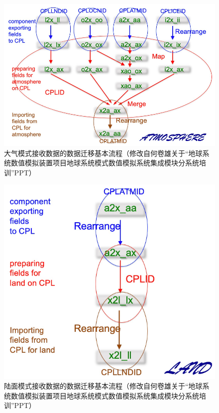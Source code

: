 {
\begin{figure}[htbp]
\centering
\includegraphics{Figures/模式构架/大气接收数据.png}
\caption{大气模式接收数据的数据迁移基本流程（修改自何卷雄关于“地球系统数值模拟装置项目地球系统模式数值模拟系统集成模块分系统培训”PPT）}
\label{fig:大气接收数据}
\end{figure}
}

{
\begin{figure}[htbp]
\centering
\includegraphics{Figures/模式构架/陆面接收数据.png}
\caption{陆面模式接收数据的数据迁移基本流程（修改自何卷雄关于“地球系统数值模拟装置项目地球系统模式数值模拟系统集成模块分系统培训”PPT）}
\label{fig:陆面接收数据}
\end{figure}
}

